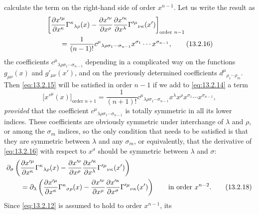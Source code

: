 calculate the term on the right-hand side of order \(x^{n-1}\). Let us write
the result as
\begin{align}
  &\left[
    \frac{\partial x'^\mu}{\partial x^\kappa}
    \Gamma^\kappa{}_{\lambda\rho}(x)
    -
    \frac{\partial x'^\nu}{\partial x^\rho}
    \frac{\partial x'^\kappa}{\partial x^\lambda}
    \Gamma'^\mu{}_{\nu\kappa}(x')
  \right]_{\text{order }n-1}
  \notag\\
  &\qquad =
  \frac{1}{(n-1)!}
  c^\mu{}_{\lambda\rho\sigma_1\cdots\sigma_{n-1}}
  x^{\sigma_1}\cdots x^{\sigma_{n-1}},
  \tag{13.2.16}\label{eq:13.2.16}
\end{align}
the coefficients
\(c^\mu{}_{\lambda\rho\sigma_1\cdots\sigma_{n-1}}\) depending in a
complicated way on the functions \(g_{\mu\nu}(x)\) and
\(g'_{\mu\nu}(x')\), and on the previously determined coefficients
\(d^\mu{}_{\rho_1\cdots\rho_m}\). Then \eqref{eq:13.2.15} will be
satisfied in order \(n-1\) if we add to \eqref{eq:13.2.14} a term
\begin{equation}
  \bigl[x'^\mu(x)\bigr]_{\text{order }n+1}
  =
  \frac{1}{(n+1)!}
  c^\mu{}_{\lambda\rho\sigma_1\cdots\sigma_{n-1}}
  x^\lambda x^\rho x^{\sigma_1}\cdots x^{\sigma_{n-1}},
  \tag{13.2.17}\label{eq:13.2.17}
\end{equation}
\emph{provided} that the coefficient
\(c^\mu{}_{\lambda\rho\sigma_1\cdots\sigma_{n-1}}\) is totally symmetric
in all its lower indices. These coefficients are obviously symmetric under
interchange of \(\lambda\) and \(\rho\), or among the \(\sigma_m\)
indices, so the only condition that needs to be satisfied is that they are
symmetric between \(\lambda\) and any \(\sigma_m\), or equivalently, that
the derivative of \eqref{eq:13.2.16} with respect to \(x^\sigma\) should
be symmetric between \(\lambda\) and \(\sigma\):
\begin{align}
  &\partial_\sigma
  \left(
    \frac{\partial x'^\mu}{\partial x^\kappa}
    \Gamma^\kappa{}_{\lambda\rho}(x)
    -
    \frac{\partial x'^\nu}{\partial x^\rho}
    \frac{\partial x'^\kappa}{\partial x^\lambda}
    \Gamma'^\mu{}_{\nu\kappa}(x')
  \right)
  \notag\\
  &\qquad =
  \partial_\lambda
  \left(
    \frac{\partial x'^\mu}{\partial x^\kappa}
    \Gamma^\kappa{}_{\sigma\rho}(x)
    -
    \frac{\partial x'^\nu}{\partial x^\rho}
    \frac{\partial x'^\kappa}{\partial x^\sigma}
    \Gamma'^\mu{}_{\nu\kappa}(x')
  \right)
  \qquad\text{in order \(x^{n-2}\)}.
  \tag{13.2.18}\label{eq:13.2.18}
\end{align}
Since \eqref{eq:13.2.12} is assumed to hold to order \(x^{n-1}\), its
